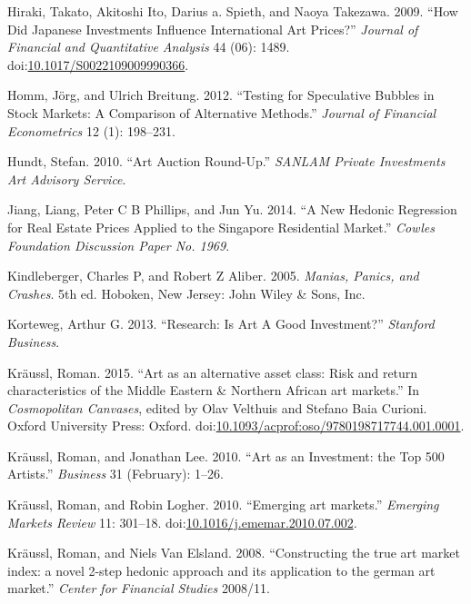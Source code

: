 \documentclass[]{elsarticle} %
\begin{document}
\hypertarget{ref-Hiraki2009}{}
Hiraki, Takato, Akitoshi Ito, Darius a. Spieth, and Naoya Takezawa.
2009. ``How Did Japanese Investments Influence International Art
Prices?'' \emph{Journal of Financial and Quantitative Analysis} 44 (06):
1489.
doi:\href{https://doi.org/10.1017/S0022109009990366}{10.1017/S0022109009990366}.

\hypertarget{ref-Homm2012}{}
Homm, Jörg, and Ulrich Breitung. 2012. ``Testing for Speculative Bubbles
in Stock Markets: A Comparison of Alternative Methods.'' \emph{Journal
of Financial Econometrics} 12 (1): 198--231.

\hypertarget{ref-Hundt2010}{}
Hundt, Stefan. 2010. ``Art Auction Round-Up.'' \emph{SANLAM Private
Investments Art Advisory Service}.

\hypertarget{ref-Jiang2014}{}
Jiang, Liang, Peter C B Phillips, and Jun Yu. 2014. ``A New Hedonic
Regression for Real Estate Prices Applied to the Singapore Residential
Market.'' \emph{Cowles Foundation Discussion Paper No. 1969}.

\hypertarget{ref-Kindleberger2005}{}
Kindleberger, Charles P, and Robert Z Aliber. 2005. \emph{Manias,
Panics, and Crashes}. 5th ed. Hoboken, New Jersey: John Wiley \& Sons,
Inc.

\hypertarget{ref-Korteweg2013}{}
Korteweg, Arthur G. 2013. ``Research: Is Art A Good Investment?''
\emph{Stanford Business}.

\hypertarget{ref-Kraussl2014}{}
Kräussl, Roman. 2015. ``Art as an alternative asset class: Risk and
return characteristics of the Middle Eastern \& Northern African art
markets.'' In \emph{Cosmopolitan Canvases}, edited by Olav Velthuis and
Stefano Baia Curioni. Oxford University Press: Oxford.
doi:\href{https://doi.org/10.1093/acprof:oso/9780198717744.001.0001}{10.1093/acprof:oso/9780198717744.001.0001}.

\hypertarget{ref-Kraussl2010}{}
Kräussl, Roman, and Jonathan Lee. 2010. ``Art as an Investment: the Top
500 Artists.'' \emph{Business} 31 (February): 1--26.

\hypertarget{ref-Kraussl2010a}{}
Kräussl, Roman, and Robin Logher. 2010. ``Emerging art markets.''
\emph{Emerging Markets Review} 11: 301--18.
doi:\href{https://doi.org/10.1016/j.ememar.2010.07.002}{10.1016/j.ememar.2010.07.002}.

\hypertarget{ref-Kraussl2008}{}
Kräussl, Roman, and Niels Van Elsland. 2008. ``Constructing the true art
market index: a novel 2-step hedonic approach and its application to the
german art market.'' \emph{Center for Financial Studies} 2008/11.
\end{document}
